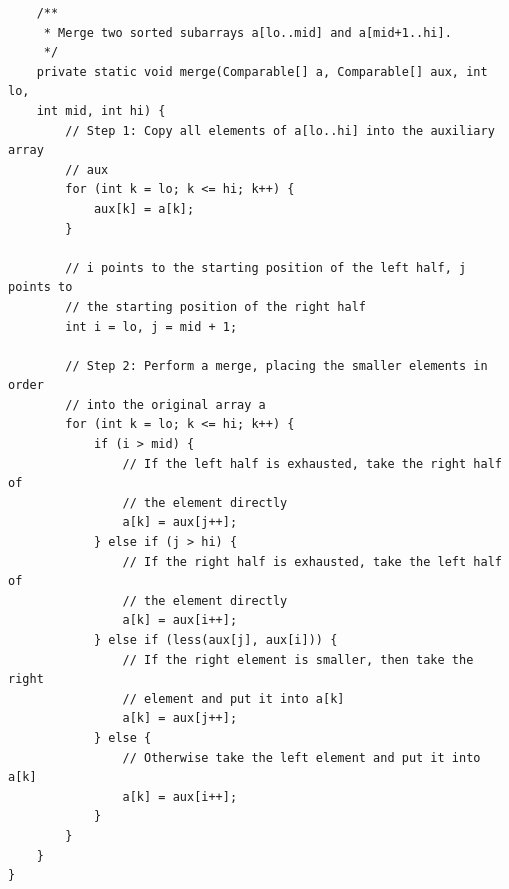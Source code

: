 \documentclass[letterpaper,12pt]{article}
\begin{document}
\begin{verbatim}
    /**
     * Merge two sorted subarrays a[lo..mid] and a[mid+1..hi].
     */
    private static void merge(Comparable[] a, Comparable[] aux, int lo,
    int mid, int hi) {
        // Step 1: Copy all elements of a[lo..hi] into the auxiliary array
        // aux
        for (int k = lo; k <= hi; k++) {
            aux[k] = a[k];
        }

        // i points to the starting position of the left half, j points to
        // the starting position of the right half
        int i = lo, j = mid + 1;

        // Step 2: Perform a merge, placing the smaller elements in order
        // into the original array a
        for (int k = lo; k <= hi; k++) {
            if (i > mid) {
                // If the left half is exhausted, take the right half of
                // the element directly
                a[k] = aux[j++];
            } else if (j > hi) {
                // If the right half is exhausted, take the left half of
                // the element directly
                a[k] = aux[i++];
            } else if (less(aux[j], aux[i])) {
                // If the right element is smaller, then take the right
                // element and put it into a[k]
                a[k] = aux[j++];
            } else {
                // Otherwise take the left element and put it into a[k]
                a[k] = aux[i++];
            }
        }
    }
}
\end{verbatim}
\end{document}
